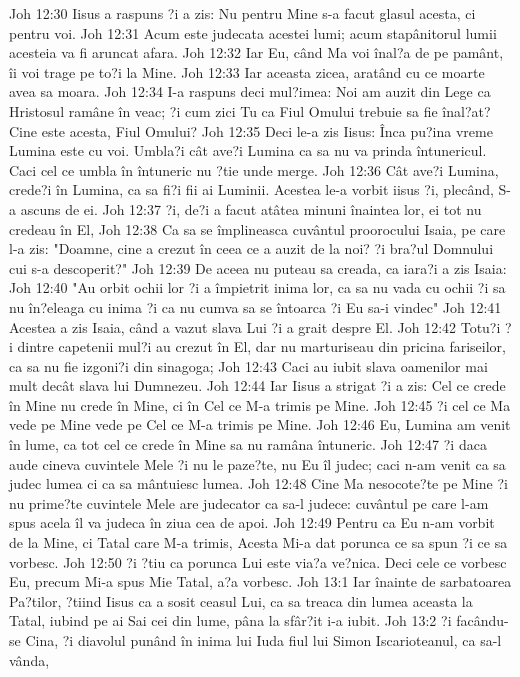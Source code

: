 Joh 12:30  Iisus a raspuns ?i a zis: Nu pentru Mine s-a facut glasul acesta, ci pentru voi.
Joh 12:31  Acum este judecata acestei lumi; acum stapânitorul lumii acesteia va fi aruncat afara.
Joh 12:32  Iar Eu, când Ma voi înal?a de pe pamânt, îi voi trage pe to?i la Mine.
Joh 12:33  Iar aceasta zicea, aratând cu ce moarte avea sa moara.
Joh 12:34  I-a raspuns deci mul?imea: Noi am auzit din Lege ca Hristosul ramâne în veac; ?i cum zici Tu ca Fiul Omului trebuie sa fie înal?at? Cine este acesta, Fiul Omului?
Joh 12:35  Deci le-a zis Iisus: Înca pu?ina vreme Lumina este cu voi. Umbla?i cât ave?i Lumina ca sa nu va prinda întunericul. Caci cel ce umbla în întuneric nu ?tie unde merge.
Joh 12:36  Cât ave?i Lumina, crede?i în Lumina, ca sa fi?i fii ai Luminii. Acestea le-a vorbit iisus ?i, plecând, S-a ascuns de ei.
Joh 12:37  ?i, de?i a facut atâtea minuni înaintea lor, ei tot nu credeau în El,
Joh 12:38  Ca sa se împlineasca cuvântul proorocului Isaia, pe care l-a zis: "Doamne, cine a crezut în ceea ce a auzit de la noi? ?i bra?ul Domnului cui s-a descoperit?"
Joh 12:39  De aceea nu puteau sa creada, ca iara?i a zis Isaia:
Joh 12:40  "Au orbit ochii lor ?i a împietrit inima lor, ca sa nu vada cu ochii ?i sa nu în?eleaga cu inima ?i ca nu cumva sa se întoarca ?i Eu sa-i vindec"
Joh 12:41  Acestea a zis Isaia, când a vazut slava Lui ?i a grait despre El.
Joh 12:42  Totu?i ?i dintre capetenii mul?i au crezut în El, dar nu marturiseau din pricina fariseilor, ca sa nu fie izgoni?i din sinagoga;
Joh 12:43  Caci au iubit slava oamenilor mai mult decât slava lui Dumnezeu.
Joh 12:44  Iar Iisus a strigat ?i a zis: Cel ce crede în Mine nu crede în Mine, ci în Cel ce M-a trimis pe Mine.
Joh 12:45  ?i cel ce Ma vede pe Mine vede pe Cel ce M-a trimis pe Mine.
Joh 12:46  Eu, Lumina am venit în lume, ca tot cel ce crede în Mine sa nu ramâna întuneric.
Joh 12:47  ?i daca aude cineva cuvintele Mele ?i nu le paze?te, nu Eu îl judec; caci n-am venit ca sa judec lumea ci ca sa mântuiesc lumea.
Joh 12:48  Cine Ma nesocote?te pe Mine ?i nu prime?te cuvintele Mele are judecator ca sa-l judece: cuvântul pe care l-am spus acela îl va judeca în ziua cea de apoi.
Joh 12:49  Pentru ca Eu n-am vorbit de la Mine, ci Tatal care M-a trimis, Acesta Mi-a dat porunca ce sa spun ?i ce sa vorbesc.
Joh 12:50  ?i ?tiu ca porunca Lui este via?a ve?nica. Deci cele ce vorbesc Eu, precum Mi-a spus Mie Tatal, a?a vorbesc.
Joh 13:1  Iar înainte de sarbatoarea Pa?tilor, ?tiind Iisus ca a sosit ceasul Lui, ca sa treaca din lumea aceasta la Tatal, iubind pe ai Sai cei din lume, pâna la sfâr?it i-a iubit.
Joh 13:2  ?i facându-se Cina, ?i diavolul punând în inima lui Iuda fiul lui Simon Iscarioteanul, ca sa-l vânda,
